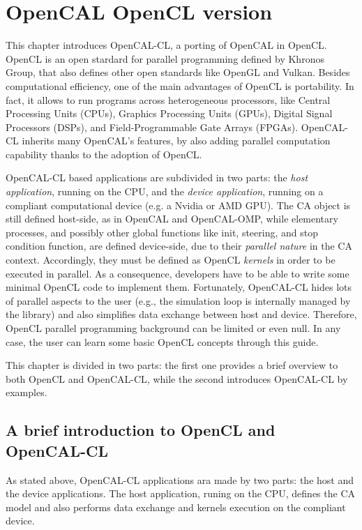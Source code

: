 \chapter{OpenCAL OpenCL version}\label{ch:opencal-cl}

This chapter introduces OpenCAL-CL, a porting of OpenCAL in
OpenCL. OpenCL is an open stardard for parallel programming defined by
Khronos Group, that also defines other open standards like OpenGL and
Vulkan. Besides computational efficiency, one of the main advantages
of OpenCL is portability. In fact, it allows to run programs across
heterogeneous processors, like Central Processing Units (CPUs),
Graphics Processing Units (GPUs), Digital Signal Processors (DSPs),
and Field-Programmable Gate Arrays (FPGAs). OpenCAL-CL inherits many
OpenCAL's features, by also adding parallel computation capability
thanks to the adoption of OpenCL.

OpenCAL-CL based applications are subdivided in two parts: the
\emph{host application}, running on the CPU, and the \emph{device
  application}, running on a compliant computational device (e.g. a
Nvidia or AMD GPU). The CA object is still defined host-side, as in
OpenCAL and OpenCAL-OMP, while elementary processes, and possibly
other global functions like init, steering, and stop condition
function, are defined device-side, due to their \textsl{parallel
  nature} in the CA context. Accordingly, they must be defined
as OpenCL \emph{kernels} in order to be executed in parallel. As a
consequence, developers have to be able to write some minimal OpenCL
code to implement them. Fortunately, OpenCAL-CL hides lots of parallel
aspects to the user (e.g., the simulation loop is internally managed
by the library) and also simplifies data exchange between host and
device. Therefore, OpenCL parallel programming background can be
limited or even null. In any case, the user can learn some basic
OpenCL concepts through this guide.

This chapter is divided in two parts: the first one provides a brief
overview to both OpenCL and OpenCAL-CL, while the second introduces OpenCAL-CL by examples.


\section{A brief introduction to OpenCL and OpenCAL-CL}\label{sec:opencalclstructure}

As stated above, OpenCAL-CL applications ara made by two parts: the
host and the device applications. The host application, runing on the
CPU, defines the CA model and also performs data exchange and kernels
execution on the compliant device.

